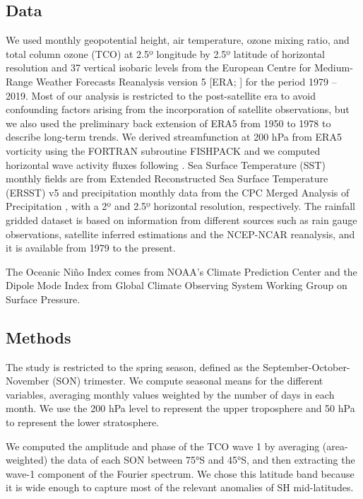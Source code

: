 \documentclass[pdflatex,lineno,sn-basic]{sn-jnl}
\theoremstyle{thmstyleone}%
\theoremstyle{thmstyletwo}%
\theoremstyle{thmstylethree}%
\begin{document}
\hypertarget{data}{%
\subsection{Data}\label{data}}

We used monthly geopotential height, air temperature, ozone mixing ratio, and total column ozone (TCO) at 2.5º longitude by 2.5º latitude of horizontal resolution and 37 vertical isobaric levels from the European Centre for Medium-Range Weather Forecasts Reanalysis version 5 {[}ERA; \citet{era5}{]} for the period 1979 -- 2019.
Most of our analysis is restricted to the post-satellite era to avoid confounding factors arising from the incorporation of satellite observations, but we also used the preliminary back extension of ERA5 from 1950 to 1978 \citep{era5be} to describe long-term trends.
We derived streamfunction at 200 hPa from ERA5 vorticity using the FORTRAN subroutine FISHPACK \citep{fishpack} and we computed horizontal wave activity fluxes following \citet{plumb1985}.
Sea Surface Temperature (SST) monthly fields are from Extended Reconstructed Sea Surface Temperature (ERSST) v5 \citep{huang2017} and precipitation monthly data from the CPC Merged Analysis of Precipitation \citep[CMAP,][]{cmap}, with a 2º and 2.5º horizontal resolution, respectively.
The rainfall gridded dataset is based on information from different sources such as rain gauge observations, satellite inferred estimations and the NCEP-NCAR reanalysis, and it is available from 1979 to the present.

The Oceanic Niño Index \citep[ONI,][]{bamston1997} comes from NOAA's Climate Prediction Center and the Dipole Mode Index \citep[DMI,][]{saji2003} from Global Climate Observing System Working Group on Surface Pressure.

\hypertarget{methods-1}{%
\subsection{Methods}\label{methods-1}}

The study is restricted to the spring season, defined as the September-October-November (SON) trimester.
We compute seasonal means for the different variables, averaging monthly values weighted by the number of days in each month.
We use the 200 hPa level to represent the upper troposphere and 50 hPa to represent the lower stratosphere.

We computed the amplitude and phase of the TCO wave 1 by averaging (area-weighted) the data of each SON between 75°S and 45°S, and then extracting the wave-1 component of the Fourier spectrum.
We chose this latitude band because it is wide enough to capture most of the relevant anomalies of SH mid-latitudes.
\end{document}
